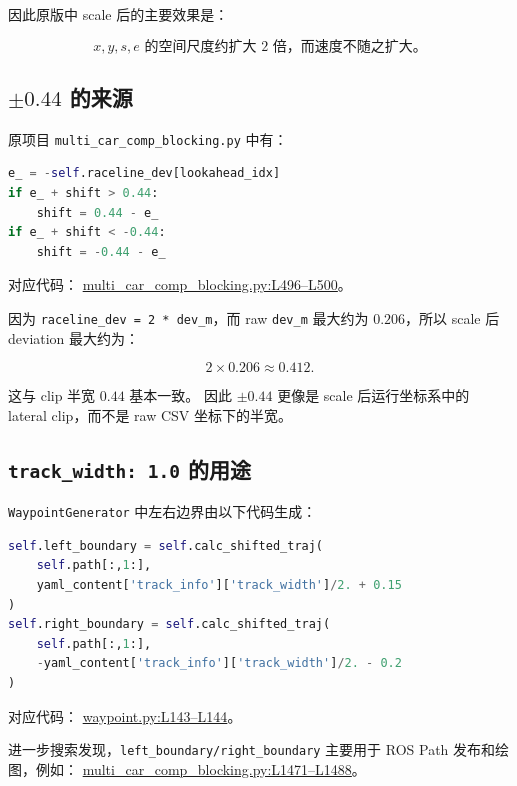\documentclass[UTF8]{ctexart}
\begin{document}
因此原版中 scale 后的主要效果是：

\[
x,y,s,e \text{ 的空间尺度约扩大 } 2 \text{ 倍，而速度不随之扩大。}
\]

\subsection{\texttt{\(\pm 0.44\)} 的来源}

原项目 \texttt{multi\_car\_comp\_blocking.py} 中有：

\begin{lstlisting}[language=Python]
e_ = -self.raceline_dev[lookahead_idx]
if e_ + shift > 0.44:
    shift = 0.44 - e_
if e_ + shift < -0.44:
    shift = -0.44 - e_
\end{lstlisting}

对应代码：
\href{https://github.com/sastry-group/alpha-RACER/blob/main/car_ros2/car_ros2/multi_car_comp_blocking.py#L496-L500}{multi\_car\_comp\_blocking.py:L496--L500}。

因为 \texttt{raceline\_dev = 2 * dev\_m}，而 raw \texttt{dev\_m} 最大约为 $0.206$，所以 scale 后 deviation 最大约为：

\[
2 \times 0.206 \approx 0.412.
\]

这与 clip 半宽 $0.44$ 基本一致。
因此 \texttt{\(\pm 0.44\)} 更像是 scale 后运行坐标系中的 lateral clip，而不是 raw CSV 坐标下的半宽。

\subsection{\texttt{track\_width: 1.0} 的用途}

\texttt{WaypointGenerator} 中左右边界由以下代码生成：

\begin{lstlisting}[language=Python]
self.left_boundary = self.calc_shifted_traj(
    self.path[:,1:],
    yaml_content['track_info']['track_width']/2. + 0.15
)
self.right_boundary = self.calc_shifted_traj(
    self.path[:,1:],
    -yaml_content['track_info']['track_width']/2. - 0.2
)
\end{lstlisting}

对应代码：
\href{https://github.com/sastry-group/alpha-RACER/blob/main/car_dynamics/car_dynamics/controllers_jax/waypoint.py#L143-L144}{waypoint.py:L143--L144}。

进一步搜索发现，\texttt{left\_boundary/right\_boundary} 主要用于 ROS Path 发布和绘图，例如：
\href{https://github.com/sastry-group/alpha-RACER/blob/main/car_ros2/car_ros2/multi_car_comp_blocking.py#L1471-L1488}{multi\_car\_comp\_blocking.py:L1471--L1488}。
\end{document}

